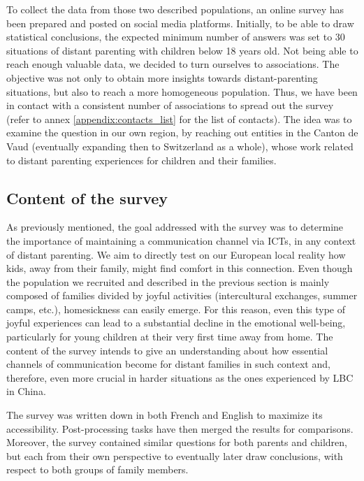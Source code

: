 To collect the data from those two described populations, an online survey has been prepared and posted on social media platforms. Initially, to be able to draw statistical conclusions, the expected minimum number of answers was set to 30 situations of distant parenting with children below 18 years old. Not being able to reach enough valuable data, we decided to turn ourselves to associations. The objective was not only to obtain more insights towards distant-parenting situations, but also to reach a more homogeneous population. Thus, we have been in contact with a consistent number of associations to spread out the survey (refer to annex \ref{appendix:contacts_list} for the list of contacts). The idea was to examine the question in our own region, by reaching out entities in the Canton de Vaud (eventually expanding then to Switzerland as a whole), whose work related to distant parenting experiences for children and their families. 

\newpage
\subsection{Content of the survey}
\label{content-survey}

As previously mentioned, the goal addressed with the survey was to determine the importance of maintaining a communication channel via ICTs, in any context of distant parenting. We aim to directly test on our European local reality how kids, away from their family, might find comfort in this connection. Even though the population we recruited and described in the previous section is mainly composed of families divided by joyful activities (intercultural exchanges, summer camps, etc.), homesickness can easily emerge. For this reason, even this type of joyful experiences can lead to a substantial decline in the emotional well-being, particularly for young children at their very first time away from home. The content of the survey intends to give an understanding about how essential channels of communication become for distant families in such context and, therefore, even more crucial in harder situations as the ones experienced by LBC in China.

The survey was written down in both French and English to maximize its accessibility. Post-processing tasks have then merged the results for comparisons. Moreover, the survey contained similar questions for both parents and children, but each from their own perspective to eventually later draw conclusions, with respect to both groups of family members.

